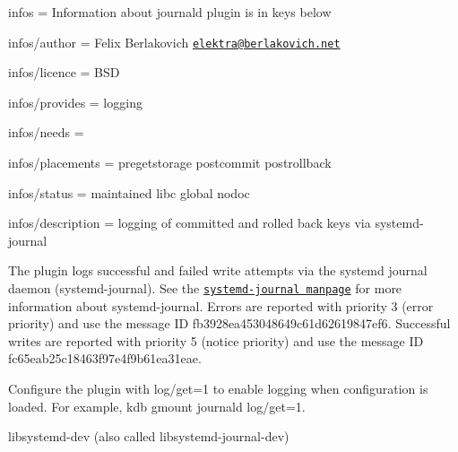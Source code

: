 
\begin{DoxyItemize}
\item infos = Information about journald plugin is in keys below
\item infos/author = Felix Berlakovich \href{mailto:elektra@berlakovich.net}{\tt elektra@berlakovich.\+net}
\item infos/licence = B\+SD
\item infos/provides = logging
\item infos/needs =
\item infos/placements = pregetstorage postcommit postrollback
\item infos/status = maintained libc global nodoc
\item infos/description = logging of committed and rolled back keys via systemd-\/journal
\end{DoxyItemize}

The plugin logs successful and failed write attempts via the systemd journal daemon (systemd-\/journal). See the \href{http://www.freedesktop.org/software/systemd/man/systemd-journald.service.html}{\tt systemd-\/journal manpage} for more information about systemd-\/journal. Errors are reported with priority 3 (error priority) and use the message ID {\ttfamily fb3928ea453048649c61d62619847ef6}. Successful writes are reported with priority 5 (notice priority) and use the message ID {\ttfamily fc65eab25c18463f97e4f9b61ea31eae}.

Configure the plugin with {\ttfamily log/get=1} to enable logging when configuration is loaded. For example, {\ttfamily kdb gmount journald log/get=1}.


\begin{DoxyItemize}
\item {\ttfamily libsystemd-\/dev} (also called {\ttfamily libsystemd-\/journal-\/dev}) 
\end{DoxyItemize}